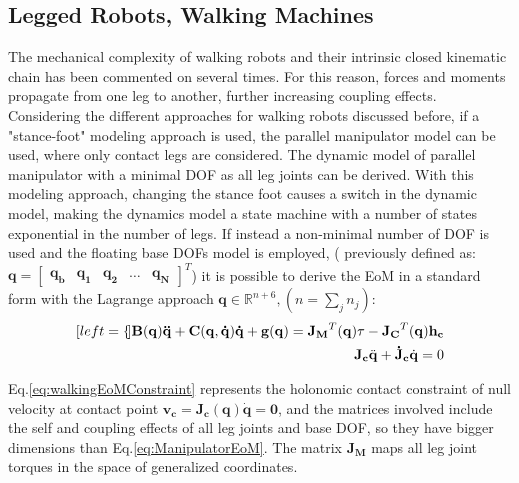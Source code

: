 \subsection{Legged Robots, Walking Machines}
\label{sec:leggedDyn}

The mechanical complexity of walking robots and their intrinsic closed kinematic chain has been commented on several times. For this reason, forces and moments propagate from one leg to another, further increasing coupling effects. 
Considering the different approaches for walking robots discussed before, if a "stance-foot" modeling approach is used, the parallel manipulator model can be used, where only contact legs are considered. The dynamic model of parallel manipulator \cite{RoboticMechanics} with a minimal DOF as all leg joints can be derived. With this modeling approach, changing the stance foot causes a switch in the dynamic model, making the dynamics model a state machine with a number of states exponential in the number of legs.  
If instead a non-minimal number of DOF is used and the floating base DOFs model is employed, ( previously defined as: $\mathbf{q} = \begin{bmatrix}
    \mathbf{q_b} & \mathbf{q_1} & \mathbf{q_2} & \dots & \mathbf{q_N}
\end{bmatrix}^T$) it is possible to derive the EoM in a standard form with the Lagrange approach\cite{QuadrupedLocomotion}\cite{HandbookLegged} $\mathbf{q} \in \mathbb{R}^{n+6}, (n=\sum_jn_j)$: 
\begin{subequations}
    \label{eq:WalkingDyn}
    \begin{align}[left=\empheqlbrace]
           \mathbf{B}(\mathbf{q})\mathbf{\ddot{q}} + \mathbf{C}(\mathbf{q},\mathbf{\dot{q}})\mathbf{\dot{q}}+ \mathbf{g}(\mathbf{q}) = \mathbf{J_M}^T(\mathbf{q})\mathbf{\tau} - \mathbf{J_C}^T(\mathbf{q})\mathbf{h_c} \label{eq:WalkingEoM} \\
    \mathbf{J_c}\ddot{\mathbf{q}} + \mathbf{\dot{J}_c}\dot{\mathbf{q}} = 0\label{eq:walkingEoMConstraint} 
    \end{align}
\end{subequations}

Eq.\ref{eq:walkingEoMConstraint} represents the holonomic contact constraint of null velocity at contact point $\mathbf{v_c} = \mathbf{J_c}(\mathbf{q})\mathbf{\dot{q}} = \mathbf{0}$, and 
the matrices involved include the self and coupling effects of all leg joints and base DOF, so they have bigger dimensions than Eq.\ref{eq:ManipulatorEoM}. The matrix $\mathbf{J_M}$ maps all leg joint torques in the space of generalized coordinates.

